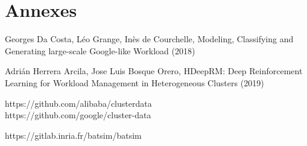 \documentclass{article}
\begin{document}
\section{Annexes}

\begin{enumerate}[label={[}\arabic*{]}]
    \item Georges Da Costa, Léo Grange, Inès de Courchelle, Modeling, Classifying and Generating large-scale Google-like Workload (2018)
    \item Adrián Herrera Arcila, Jose Luis Bosque Orero, HDeepRM: Deep Reinforcement Learning   for Workload  Management in Heterogeneous Clusters (2019)
    \item https://github.com/alibaba/clusterdata\\
    https://github.com/google/cluster-data
    \item https://gitlab.inria.fr/batsim/batsim
\end{enumerate}
\end{document}
